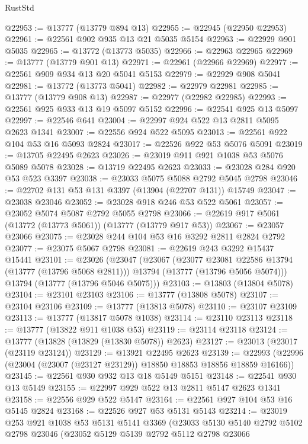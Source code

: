 \begin{lexlean}{RustStd}
\begin{coremodule}
@22953 := @13777 (@13779 @894 @13)
@22955 := @22945 (@22950 @22953)
@22961 := @22561 @902 @935 @13 @21 @5035 @5154
@22963 := @22929 @901 @5035
@22965 := @13772 (@13773 @5035)
@22966 := @22963 @22965
@22969 := @13777 (@13779 @901 @13)
@22971 := @22961 (@22966 @22969)
@22977 := @22561 @909 @934 @13 @20 @5041 @5153
@22979 := @22929 @908 @5041
@22981 := @13772 (@13773 @5041)
@22982 := @22979 @22981
@22985 := @13777 (@13779 @908 @13)
@22987 := @22977 (@22982 @22985)
@22993 := @22561 @925 @933 @13 @19 @5097 @5152
@22996 := @22541 @925 @13 @5097
@22997 := @22546 @641
@23004 := @22997 @924 @522 @13 @2811 @5095 @2623 @1341
@23007 := @22556 @924 @522 @5095
@23013 := @22561 @922 @104 @53 @16 @5093 @2824
@23017 := @22526 @922 @53 @5076 @5091
@23019 := @13705 @22495 @2623
@23026 := @23019 @911 @921 @1038 @53 @5076 @5089 @5078
@23028 := @13719 @22495 @2623
@23033 := @23028 @284 @920 @53 @523 @3397
@23038 := @23033 @5075 @5088 @2792 @5045 @2798
@23046 := @22702 @131 @53 @131 @3397 (@13904 (@22707 @131)) @15749
@23047 := @23038 @23046
@23052 := @23028 @918 @246 @53 @522 @5061
@23057 := @23052 @5074 @5087 @2792 @5055 @2798
@23066 := @22619 @917 @5061 (@13772 (@13773 @5061)) (@13777 (@13779 @917 @53))
@23067 := @23057 @23066
@23075 := @23028 @244 @104 @53 @16 @3292 @2811 @2824 @2792
@23077 := @23075 @5067 @2798
@23081 := @22619 @243 @3292 @15437 @15441
@23101 := @23026
    (@23047
      (@23067
        (@23077 @23081 @22586 @13794 (@13777 (@13796 @5068 @2811)))
        @13794
        (@13777 (@13796 @5056 @5074)))
      @13794
      (@13777 (@13796 @5046 @5075)))
@23103 := @13803 (@13804 @5078)
@23104 := @23101 @23103
@23106 := @13777 (@13808 @5078)
@23107 := @23104 @23106
@23109 := @13777 (@13813 @5078)
@23110 := @23107 @23109
@23113 := @13777 (@13817 @5078 @1038)
@23114 := @23110 @23113
@23118 := @13777 (@13822 @911 @1038 @53)
@23119 := @23114 @23118
@23124 := @13777 (@13828 (@13829 (@13830 @5078)) @2623)
@23127 := @23013 (@23017 (@23119 @23124))
@23129 := @13921 @22495 @2623
@23139 := @22993 (@22996 (@23004 (@23007 (@23127 @23129)) @18850 @18853 @18856 @18859 @16166))
@23145 := @22561 @930 @932 @13 @18 @5149 @5151
@23148 := @22541 @930 @13 @5149
@23155 := @22997 @929 @522 @13 @2811 @5147 @2623 @1341
@23158 := @22556 @929 @522 @5147
@23164 := @22561 @927 @104 @53 @16 @5145 @2824
@23168 := @22526 @927 @53 @5131 @5143
@23214 := @23019
    @253
    @921
    @1038
    @53
    @5131
    @5141
    @3369
    (@23033
      @5130
      @5140
      @2792
      @5102
      @2798
      @23046
      (@23052
        @5129
        @5139
        @2792
        @5112
        @2798
        @23066

\end{coremodule}
\end{lexlean}
